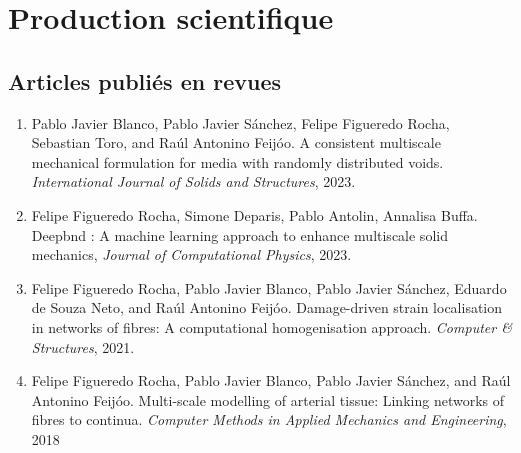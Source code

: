 \documentclass[french]{article}
\begin{document}
%

\section*{Production scientifique} \label{sec:travaux}

\subsection*{Articles publiés en revues}
\begin{enumerate}
	\item Pablo Javier Blanco, Pablo Javier Sánchez, Felipe Figueredo Rocha, Sebastian Toro, and Raúl Antonino Feijóo. A consistent multiscale mechanical formulation for media with randomly distributed voids. \textit{International Journal of Solids and Structures}, 2023.
	\item Felipe Figueredo Rocha, Simone Deparis, Pablo Antolin, Annalisa Buffa.  Deepbnd : A machine learning approach to enhance multiscale solid mechanics, \textit{Journal of Computational Physics}, 2023.
	\item Felipe Figueredo Rocha, Pablo Javier Blanco, Pablo Javier Sánchez, Eduardo de Souza Neto, and Raúl Antonino Feijóo. Damage-driven strain localisation in networks of fibres: A computational homogenisation approach. \textit{Computer \& Structures}, 2021.
	\item Felipe Figueredo Rocha, Pablo Javier Blanco, Pablo Javier Sánchez, and Raúl Antonino Feijóo. Multi-scale modelling of arterial tissue: Linking networks of fibres to continua. \textit{Computer Methods in Applied Mechanics and Engineering}, 2018
\end{enumerate}	
\end{document}
